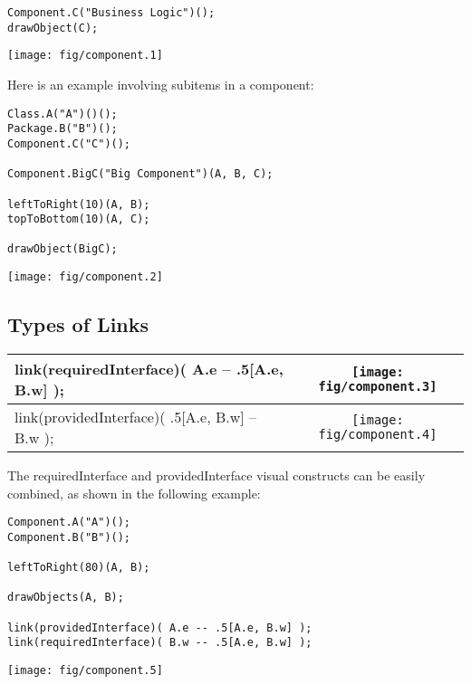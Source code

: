 \documentclass{article}
\newcommand{\code}{\ttfamily}
\begin{document}
\begin{multicols}{2}
\begin{verbatim}
Component.C("Business Logic")();
drawObject(C);
\end{verbatim}
\columnbreak
\hspace{3cm}\texttt{[image: fig/component.1]}
\end{multicols}

Here is an example involving subitems in a component:

\begin{multicols}{2}
\begin{verbatim}
Class.A("A")()();
Package.B("B")();
Component.C("C")();

Component.BigC("Big Component")(A, B, C);

leftToRight(10)(A, B);
topToBottom(10)(A, C);

drawObject(BigC);
\end{verbatim}
\columnbreak
\hspace{3cm}\texttt{[image: fig/component.2]}
\end{multicols}

\subsection{Types of Links}

\begin{tabular}{||l|c||}
\hline
{\code link(requiredInterface)( A.e -- .5[A.e, B.w] );} & \texttt{[image: fig/component.3]} \\
\hline
{\code link(providedInterface)( .5[A.e, B.w] -- B.w );} & \texttt{[image: fig/component.4]} \\
\hline
\end{tabular}

\vspace{0.5cm}

The {\code requiredInterface} and {\code providedInterface} visual constructs can be easily combined, as shown in the following example:

\begin{multicols}{2}
\begin{verbatim}
Component.A("A")();
Component.B("B")();

leftToRight(80)(A, B);

drawObjects(A, B);

link(providedInterface)( A.e -- .5[A.e, B.w] );
link(requiredInterface)( B.w -- .5[A.e, B.w] );
\end{verbatim}
\columnbreak
\hspace{-1cm}\texttt{[image: fig/component.5]}
\end{multicols}
\end{document}
